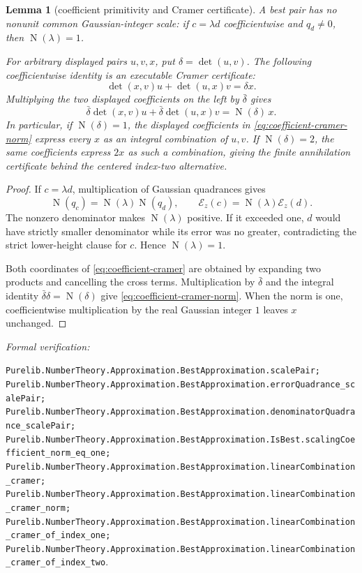 \documentclass[11pt]{article}
\newtheorem{lemma}[lemma]{Lemma}
\newcommand{\Norm}[1]{\operatorname{N}\!\left(#1\right)}
\newcommand{\leanref}[1]{\par\smallskip\noindent
  \emph{Formal verification:}\par\nobreak
  {\raggedright\nolinkurl{#1}.\par}}
\begin{document}
\begin{lemma}[coefficient primitivity and Cramer certificate]
\label{lem:coefficient-cramer}
A best pair has no nonunit common Gaussian-integer scale: if
$c=\lambda d$ coefficientwise and $q_d\ne0$, then $\Norm\lambda=1$.

For arbitrary displayed pairs $u,v,x$, put
$\delta=\det(u,v)$.  The following coefficientwise identity is an executable
Cramer certificate:
\begin{equation}
\label{eq:coefficient-cramer}
 \det(x,v)u+\det(u,x)v=\delta x.
\end{equation}
Multiplying the two displayed coefficients on the left by $\bar\delta$ gives
\begin{equation}
\label{eq:coefficient-cramer-norm}
 \bar\delta\det(x,v)u+\bar\delta\det(u,x)v
      =\Norm\delta\,x.
\end{equation}
In particular, if $\Norm\delta=1$, the displayed coefficients in
\eqref{eq:coefficient-cramer-norm} express every $x$ as an integral
combination of $u,v$.  If $\Norm\delta=2$, the same coefficients express
$2x$ as such a combination, giving the finite annihilation certificate behind
the centered index-two alternative.
\end{lemma}

\begin{proof}
If $c=\lambda d$, multiplication of Gaussian quadrances gives
\[
 \Norm{q_c}=\Norm\lambda\Norm{q_d},
 \qquad
 \mathcal E_z(c)=\Norm\lambda\mathcal E_z(d).
\]
The nonzero denominator makes $\Norm\lambda$ positive.  If it exceeded one,
$d$ would have strictly smaller denominator while its error was no greater,
contradicting the strict lower-height clause for $c$.  Hence
$\Norm\lambda=1$.

Both coordinates of \eqref{eq:coefficient-cramer} are obtained by expanding
two products and cancelling the cross terms.  Multiplication by
$\bar\delta$ and the integral identity
$\bar\delta\delta=\Norm\delta$ give
\eqref{eq:coefficient-cramer-norm}.  When the norm is one, coefficientwise
multiplication by the real Gaussian integer $1$ leaves $x$ unchanged.
\end{proof}

\leanref{Purelib.NumberTheory.Approximation.BestApproximation.scalePair;
Purelib.NumberTheory.Approximation.BestApproximation.errorQuadrance_scalePair;
Purelib.NumberTheory.Approximation.BestApproximation.denominatorQuadrance_scalePair;
Purelib.NumberTheory.Approximation.BestApproximation.IsBest.scalingCoefficient_norm_eq_one;
Purelib.NumberTheory.Approximation.BestApproximation.linearCombination_cramer;
Purelib.NumberTheory.Approximation.BestApproximation.linearCombination_cramer_norm;
Purelib.NumberTheory.Approximation.BestApproximation.linearCombination_cramer_of_index_one;
Purelib.NumberTheory.Approximation.BestApproximation.linearCombination_cramer_of_index_two}
\end{document}
